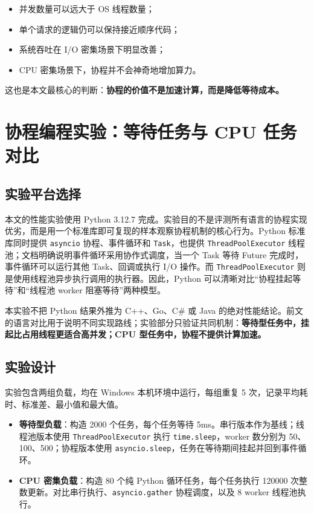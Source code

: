 \documentclass[UTF8,zihao=-4]{ctexart}
\begin{document}
\begin{itemize}
  \item 并发数量可以远大于 OS 线程数量；
  \item 单个请求的逻辑仍可以保持接近顺序代码；
  \item 系统吞吐在 I/O 密集场景下明显改善；
  \item CPU 密集场景下，协程并不会神奇地增加算力。
\end{itemize}

这也是本文最核心的判断：\textbf{协程的价值不是加速计算，而是降低等待成本。}

\section{协程编程实验：等待任务与 CPU 任务对比}

\subsection{实验平台选择}

本文的性能实验使用 Python 3.12.7 完成。实验目的不是评测所有语言的协程实现优劣，而是用一个标准库即可复现的样本观察协程机制的核心行为。Python 标准库同时提供 \texttt{asyncio} 协程、事件循环和 \texttt{Task}，也提供 \texttt{ThreadPoolExecutor} 线程池；文档明确说明事件循环采用协作式调度，当一个 Task 等待 Future 完成时，事件循环可以运行其他 Task、回调或执行 I/O 操作\cite{asyncio-task}。而 \texttt{ThreadPoolExecutor} 则是使用线程池异步执行调用的执行器\cite{concurrent-futures}。因此，Python 可以清晰对比“协程挂起等待”和“线程池 worker 阻塞等待”两种模型。

本实验不把 Python 结果外推为 C++、Go、C\# 或 Java 的绝对性能结论。前文的语言对比用于说明不同实现路线；实验部分只验证共同机制：\textbf{等待型任务中，挂起比占用线程更适合高并发；CPU 型任务中，协程不提供计算加速。}

\subsection{实验设计}

实验包含两组负载，均在 Windows 本机环境中运行，每组重复 5 次，记录平均耗时、标准差、最小值和最大值。

\begin{itemize}
  \item \textbf{等待型负载}：构造 2000 个任务，每个任务等待 5ms。串行版本作为基线；线程池版本使用 \texttt{ThreadPoolExecutor} 执行 \texttt{time.sleep}，worker 数分别为 50、100、500；协程版本使用 \texttt{asyncio.sleep}，任务在等待期间挂起并回到事件循环。
  \item \textbf{CPU 密集负载}：构造 80 个纯 Python 循环任务，每个任务执行 120000 次整数更新。对比串行执行、\texttt{asyncio.gather} 协程调度，以及 8 worker 线程池执行。
\end{itemize}
\end{document}
